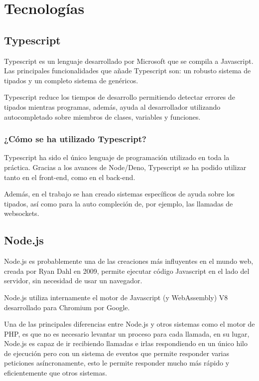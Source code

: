\section{Tecnologías}


\subsection{Typescript}
Typescript \cite{typescript_docs} es un lenguaje desarrollado por Microsoft que se compila a Javascript. Las principales funcionalidades que añade Typescript son: un robusto sistema de tipados y un completo sistema de genéricos.

Typescript reduce los tiempos de desarrollo permitiendo detectar errores de tipados mientras programas, además, ayuda al desarrollador utilizando autocompletado sobre miembros de clases, variables y funciones.

\subsubsection{¿Cómo se ha utilizado Typescript?}
Typescript ha sido el único lenguaje de programación utilizado en toda la práctica. Gracias a los avances de Node/Deno, Typescript se ha podido utilizar tanto en el front-end, como en el back-end.

Además, en el trabajo se han creado sistemas específicos de ayuda sobre los tipados, así como para la auto compleción de, por ejemplo, las llamadas de websockets.


\subsection{Node.js}
Node.js \cite{nodejs_docs} es probablemente una de las creaciones más influyentes en el mundo web, creada por Ryan Dahl en 2009, permite ejecutar código Javascript en el lado del servidor, sin necesidad de usar un navegador.

Node.js utiliza internamente el motor de Javascript (y WebAssembly) V8 desarrollado para Chromium por Google.

Una de las principales diferencias entre Node.js y otros sistemas como el motor de PHP, es que no es necesario levantar un proceso para cada llamada, en su lugar, Node.js es capaz de ir recibiendo llamadas e irlas respondiendo en un único hilo de ejecución pero con un sistema de eventos que permite responder varias peticiones asíncronamente, esto le permite responder mucho más rápido y eficientemente que otros sistemas.

